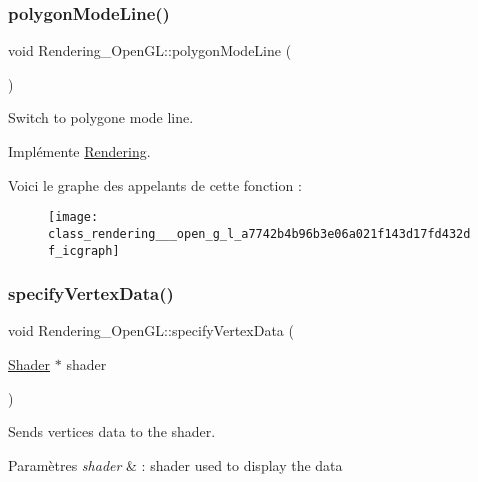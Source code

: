 \subsubsection{\texorpdfstring{polygon\+Mode\+Line()}{polygonModeLine()}}
{\footnotesize\ttfamily void Rendering\+\_\+\+Open\+G\+L\+::polygon\+Mode\+Line (\begin{DoxyParamCaption}{ }\end{DoxyParamCaption})\hspace{0.3cm}{\ttfamily [virtual]}}



Switch to polygone mode line. 



Implémente \hyperlink{class_rendering_aeb3922ecc539c6d8e9339fb3760cd560}{Rendering}.

Voici le graphe des appelants de cette fonction \+:\nopagebreak
\begin{figure}[H]
\begin{center}
\leavevmode
\texttt{[image: class\_rendering\_\_\_open\_g\_l\_a7742b4b96b3e06a021f143d17fd432df\_icgraph]}
\end{center}
\end{figure}
\mbox{\label{class_rendering___open_g_l_a8ad1a3e698d694782f4174d94b745cd5}} 
\subsubsection{\texorpdfstring{specify\+Vertex\+Data()}{specifyVertexData()}}
{\footnotesize\ttfamily void Rendering\+\_\+\+Open\+G\+L\+::specify\+Vertex\+Data (\begin{DoxyParamCaption}\item[{\hyperlink{class_shader}{Shader} $\ast$}]{shader }\end{DoxyParamCaption})\hspace{0.3cm}{\ttfamily [virtual]}}



Sends vertices data to the shader. 


\begin{DoxyParams}{Paramètres}
{\em shader} & \+: shader used to display the data \\
\hline
\end{DoxyParams}


